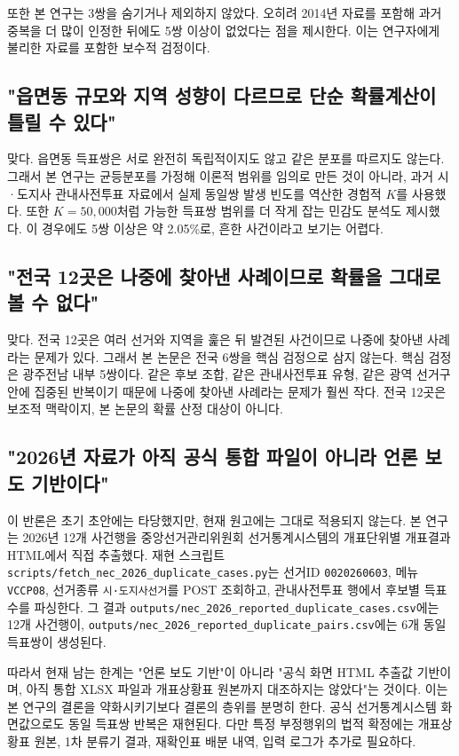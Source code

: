 \documentclass[preprint]{IEIE}
\begin{document}
또한 본 연구는 3쌍을 숨기거나 제외하지 않았다. 오히려 2014년 자료를 포함해 과거 중복을 더 많이 인정한 뒤에도 5쌍 이상이 없었다는 점을 제시한다. 이는 연구자에게 불리한 자료를 포함한 보수적 검정이다.

\subsection{"읍면동 규모와 지역 성향이 다르므로 단순 확률계산이 틀릴 수 있다"}

맞다. 읍면동 득표쌍은 서로 완전히 독립적이지도 않고 같은 분포를 따르지도 않는다. 그래서 본 연구는 균등분포를 가정해 이론적 범위를 임의로 만든 것이 아니라, 과거 시·도지사 관내사전투표 자료에서 실제 동일쌍 발생 빈도를 역산한 경험적 \(K\)를 사용했다. 또한 \(K=50,000\)처럼 가능한 득표쌍 범위를 더 작게 잡는 민감도 분석도 제시했다. 이 경우에도 5쌍 이상은 약 2.05\%로, 흔한 사건이라고 보기는 어렵다.

\subsection{"전국 12곳은 나중에 찾아낸 사례이므로 확률을 그대로 볼 수 없다"}

맞다. 전국 12곳은 여러 선거와 지역을 훑은 뒤 발견된 사건이므로 나중에 찾아낸 사례라는 문제가 있다. 그래서 본 논문은 전국 6쌍을 핵심 검정으로 삼지 않는다. 핵심 검정은 광주전남 내부 5쌍이다. 같은 후보 조합, 같은 관내사전투표 유형, 같은 광역 선거구 안에 집중된 반복이기 때문에 나중에 찾아낸 사례라는 문제가 훨씬 작다. 전국 12곳은 보조적 맥락이지, 본 논문의 확률 산정 대상이 아니다.

\subsection{"2026년 자료가 아직 공식 통합 파일이 아니라 언론 보도 기반이다"}

이 반론은 초기 초안에는 타당했지만, 현재 원고에는 그대로 적용되지 않는다. 본 연구는 2026년 12개 사건행을 중앙선거관리위원회 선거통계시스템의 개표단위별 개표결과 HTML에서 직접 추출했다. 재현 스크립트 \texttt{scripts/fetch\_nec\_2026\_duplicate\_cases.py}는 선거ID \texttt{0020260603}, 메뉴 \texttt{VCCP08}, 선거종류 \texttt{시·도지사선거}를 POST 조회하고, 관내사전투표 행에서 후보별 득표수를 파싱한다. 그 결과 \texttt{outputs/nec\_2026\_reported\_duplicate\_cases.csv}에는 12개 사건행이, \texttt{outputs/nec\_2026\_reported\_duplicate\_pairs.csv}에는 6개 동일 득표쌍이 생성된다.

따라서 현재 남는 한계는 "언론 보도 기반"이 아니라 "공식 화면 HTML 추출값 기반이며, 아직 통합 XLSX 파일과 개표상황표 원본까지 대조하지는 않았다"는 것이다. 이는 본 연구의 결론을 약화시키기보다 결론의 층위를 분명히 한다. 공식 선거통계시스템 화면값으로도 동일 득표쌍 반복은 재현된다. 다만 특정 부정행위의 법적 확정에는 개표상황표 원본, 1차 분류기 결과, 재확인표 배분 내역, 입력 로그가 추가로 필요하다.
\end{document}
